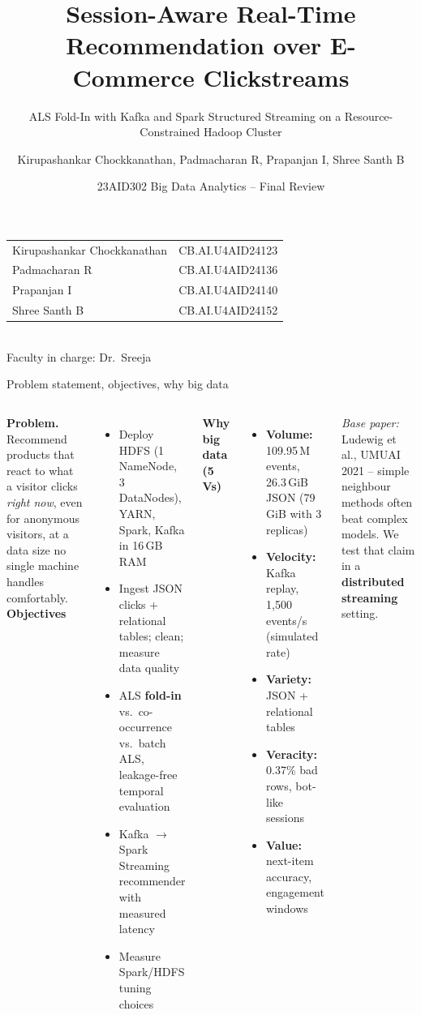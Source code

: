 \documentclass[aspectratio=169,10pt]{beamer}
\title[Session-Aware Real-Time Recommendation]{Session-Aware Real-Time Recommendation over E-Commerce Clickstreams}
\subtitle{ALS Fold-In with Kafka and Spark Structured Streaming on a Resource-Constrained Hadoop Cluster}
\author[Group B9]{Kirupashankar Chockkanathan, Padmacharan R, Prapanjan I, Shree Santh B}
\institute[Amrita AI]{Amrita School of Artificial Intelligence, Amrita Vishwa Vidyapeetham}
\date{23AID302 Big Data Analytics -- Final Review}
\begin{document}
\begin{frame}
  \titlepage
  \centering\scriptsize
  \begin{tabular}{ll}
    Kirupashankar Chockkanathan & CB.AI.U4AID24123\\
    Padmacharan R & CB.AI.U4AID24136\\
    Prapanjan I & CB.AI.U4AID24140\\
    Shree Santh B & CB.AI.U4AID24152\\
  \end{tabular}\\[2pt]
  Faculty in charge: Dr.\ Sreeja
\end{frame}

\begin{frame}{Problem statement, objectives, why big data}
  \begin{columns}[T]
  \textbf{Problem.} Recommend products that react to what a visitor clicks \emph{right now}, even for anonymous visitors, at a data size no single machine handles comfortably.\\[4pt]
  \textbf{Objectives}
  \begin{itemize}\footnotesize
    \item Deploy HDFS (1 NameNode, 3 DataNodes), YARN, Spark, Kafka in 16\,GB RAM
    \item Ingest JSON clicks + relational tables; clean; measure data quality
    \item ALS \textbf{fold-in} vs.\ co-occurrence vs.\ batch ALS, leakage-free temporal evaluation
    \item Kafka $\to$ Spark Streaming recommender with measured latency
    \item Measure Spark/HDFS tuning choices
  \end{itemize}
  \textbf{Why big data (5\,Vs)}
  \begin{itemize}\footnotesize
    \item \textbf{Volume:} 109.95\,M events, 26.3\,GiB JSON (79\,GiB with 3 replicas)
    \item \textbf{Velocity:} Kafka replay, 1{,}500 events/s (simulated rate)
    \item \textbf{Variety:} JSON + relational tables
    \item \textbf{Veracity:} 0.37\% bad rows, bot-like sessions
    \item \textbf{Value:} next-item accuracy, engagement windows
  \end{itemize}
  \vspace{3pt}\footnotesize\emph{Base paper:} Ludewig et al., UMUAI 2021 -- simple neighbour methods often beat complex models. We test that claim in a \textbf{distributed streaming} setting.
  \end{columns}
\end{frame}
\end{document}
